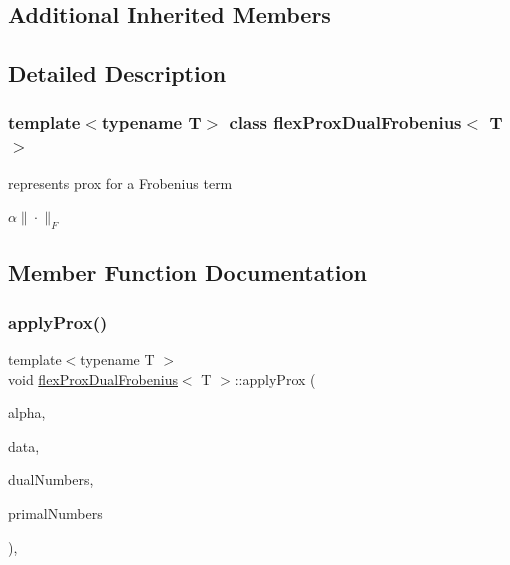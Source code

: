 \subsection*{Additional Inherited Members}


\subsection{Detailed Description}
\subsubsection*{template$<$typename T$>$\newline
class flex\+Prox\+Dual\+Frobenius$<$ T $>$}

represents prox for a Frobenius term 

$ \alpha\|\cdot\|_{F} $ 

\subsection{Member Function Documentation}
\mbox{\label{classflex_prox_dual_frobenius_a08de45a25d007ea87379641d027fd228}} 
\subsubsection{\texorpdfstring{apply\+Prox()}{applyProx()}\hspace{0.1cm}{\footnotesize\ttfamily [1/2]}}
{\footnotesize\ttfamily template$<$typename T $>$ \\
void \hyperlink{classflex_prox_dual_frobenius}{flex\+Prox\+Dual\+Frobenius}$<$ T $>$\+::apply\+Prox (\begin{DoxyParamCaption}\item[{T}]{alpha,  }\item[{\hyperlink{classflex_box_data}{flex\+Box\+Data}$<$ T $>$ $\ast$}]{data,  }\item[{const std\+::vector$<$ int $>$ \&}]{dual\+Numbers,  }\item[{const std\+::vector$<$ int $>$ \&}]{primal\+Numbers }\end{DoxyParamCaption})\hspace{0.3cm}{\ttfamily [inline]}, {\ttfamily [virtual]}}



